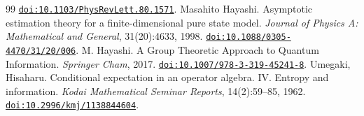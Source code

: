 \documentclass[journal]{IEEEtran}
\begin{document}
\begin{thebibliography}{99}
\newblock \href{https://doi.org/10.1103/PhysRevLett.80.1571}{\texttt{doi:10.1103/PhysRevLett.80.1571}}.  
Masahito Hayashi.
\newblock Asymptotic estimation theory for a finite-dimensional pure state model.
\newblock \emph{Journal of Physics A: Mathematical and General}, 31(20):4633, 1998.  
\newblock \href{https://doi.org/10.1088/0305-4470/31/20/006}{\texttt{doi:10.1088/0305-4470/31/20/006}}.  
M. Hayashi.
\newblock A Group Theoretic Approach to Quantum Information.
\newblock \emph{Springer Cham}, 2017.  
\newblock \href{https://doi.org/10.1007/978-3-319-45241-8}{\texttt{doi:10.1007/978-3-319-45241-8}}.  
Umegaki, Hisaharu.
\newblock Conditional expectation in an operator algebra. IV. Entropy and information.
\newblock \emph{Kodai Mathematical Seminar Reports}, 14(2):59--85, 1962.  
\newblock \href{https://doi.org/10.2996/kmj/1138844604}{\texttt{doi:10.2996/kmj/1138844604}}.  
\end{thebibliography}
\end{document}
